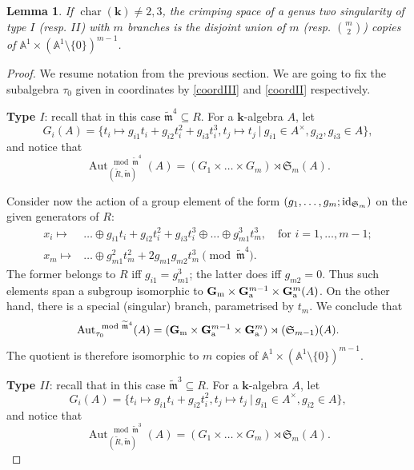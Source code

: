 \documentclass{compositio}
\renewcommand{\k}{\mathbf k}
\newcommand{\tR}{\widetilde{R}}
\newcommand{\tm}{\widetilde{\mathfrak m}}
\newcommand{\Aaff}{\mathbb A}
\newcommand{\Gm}{\mathbb{G}_{\rm{m}}}
\newcommand{\Ga}{\mathbb{G}_{\rm{a}}}
\newcommand{\Aut}{\operatorname{Aut}}
\newcommand{\id}{{\rm id}}
\theoremstyle{plain}
\newtheorem{lem}[thm]{Lemma}
\theoremstyle{definition}
\theoremstyle{remark}
\begin{document}
\begin{lem}\label{lem:crimping}
 If $\operatorname{char}(\k)\neq2,3$, the crimping space of a genus two singularity of type $I$ (resp. $I\!I$) with $m$ branches is the disjoint union of $m$ (resp. ${m}\choose{2}$) copies of $\Aaff^1\times(\Aaff^1\setminus\{0\})^{m-1}$.
\end{lem}
\begin{proof}
We resume notation from the previous section. We are going to fix the subalgebra $\tau_0$ given in coordinates by \eqref{coordIII} and \eqref{coordII} respectively.

\textbf{Type $I$}: recall that in this case $\tm^4\subseteq R$. For a $\k$-algebra $A$, let
\[G_i(A)=\{t_i\mapsto g_{i1}t_i+g_{i2}t_i^2+g_{i3}t_i^3,t_j\mapsto t_j\ |\ g_{i1}\in A^\times,g_{i2},g_{i3}\in A\},\]
and notice that
\[\Aut_{(\tR,\tm)}^{\mod\tm^4}(A)=(G_1\times\ldots\times G_m)\rtimes \mathfrak{S}_m(A).\]

Consider now the action of a group element of the form $(g_1,\ldots,g_m;\id_{\mathfrak{S}_m})$ on the given generators of $R$:
\begin{align*}
 x_i\mapsto& \ldots\oplus g_{i1}t_i+g_{i2}t_i^2+g_{i3}t_i^3\oplus\ldots\oplus g_{m1}^3t_m^3,\quad\text{for } i=1,\ldots,m-1;\\
 x_m\mapsto& \ldots\oplus g_{m1}^2t_m^2+2g_{m1}g_{m2}t_m^3 \pmod{\tm^4}.
\end{align*}
The former belongs to $R$ iff $g_{i1}=g_{m1}^3$; the latter does iff $g_{m2}=0$. Thus such elements span a subgroup isomorphic to $\Gm\times\Ga^{m-1}\times\Ga^m(A)$. On the other hand, there is a special (singular) branch, parametrised by $t_m$. We conclude that
\[\Aut_{\tau_0}^{\mod\tm^4}(A)=(\Gm\times\Ga^{m-1}\times\Ga^m)\rtimes(\mathfrak{S}_{m-1})(A).\]
The quotient is therefore isomorphic to $m$ copies of $\Aaff^1\times(\Aaff^1\setminus\{0\})^{m-1}$. 

\textbf{Type $I\!I$}: recall that in this case $\tm^3\subseteq R$. For a $\k$-algebra $A$, let
\[G_i(A)=\{t_i\mapsto g_{i1}t_i+g_{i2}t_i^2,t_j\mapsto t_j\ |\ g_{i1}\in A^\times,g_{i2}\in A\},\]
and notice that
\[\Aut_{(\tR,\tm)}^{\mod\tm^3}(A)=(G_1\times\ldots\times G_m)\rtimes \mathfrak{S}_m(A).\]


\end{proof}
\end{document}

